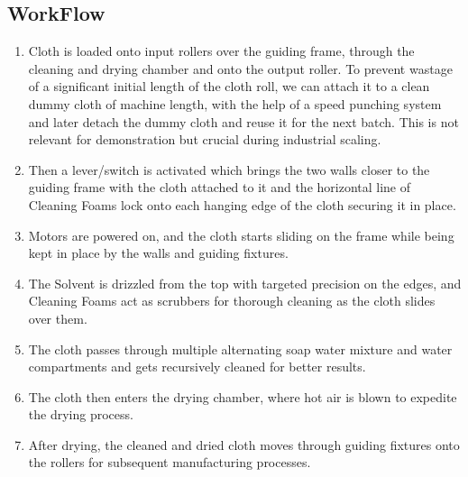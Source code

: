\documentclass[table,french,english]{rapportCS}
\begin{document}
\subsection{WorkFlow}
\begin{enumerate}[label=$\bullet$]

    \item Cloth is loaded onto input rollers over the guiding frame, through the cleaning and drying chamber and onto the output roller. To prevent wastage of a significant initial length of the cloth roll, we can attach it to a clean dummy cloth of machine length, with the help of a speed punching system and later detach the dummy cloth and reuse it for the next batch. This is not relevant for demonstration but crucial during industrial scaling.

    \item Then a lever/switch is activated which brings the two walls closer to the guiding frame with the cloth attached to it and the horizontal line of Cleaning Foams lock onto each hanging edge of the cloth securing it in place.

    \item Motors are powered on, and the cloth starts sliding on the frame while being kept in place by the walls and guiding fixtures.

    \item The Solvent is drizzled from the top with targeted precision on the edges, and Cleaning Foams act as scrubbers for thorough cleaning as the cloth slides over them.

    \item The cloth passes through multiple alternating soap water mixture and water compartments and gets recursively cleaned for better results.

    \item The cloth then enters the drying chamber, where hot air is blown to expedite the drying process.

    \item After drying, the cleaned and dried cloth moves through guiding fixtures onto the rollers for subsequent manufacturing processes.

\end{enumerate}
\end{document}
